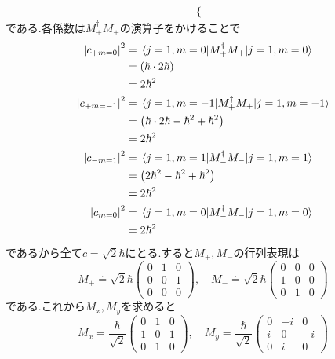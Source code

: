 \documentclass[uplatex,dvipdfmx, a4paper,11pt]{jsarticle}
\begin{document}
\begin{enumerate}[1.]
\begin{enumerate}[1）]
\begin{align*}
\begin{cases}
        \end{cases}
    \end{align*}
    である.各係数は$M_{\pm}^{\dagger}M_{\pm}$の演算子をかけることで
    \begin{align*}
        \abs{c_{+m=0}}^2&=\ev{M_{+}^{\dagger}M_{+}}{j=1,m=0}\\
        &=\qty(\hbar \cdot2\hbar)\\
        &=2\hbar^2\\
        \abs{c_{+m=-1}}^2&=\ev{M_{+}^{\dagger}M_{+}}{j=1,m=-1}\\
        &=\qty(\hbar\cdot2\hbar-\hbar^2+\hbar^2)\\
        &=2\hbar^2\\
        \abs{c_{-m=1}}^2&=\ev{M_{-}^{\dagger}M_{-}}{j=1,m=1}\\
        &=\qty(2\hbar^2-\hbar^2+\hbar^2)\\
        &=2\hbar^2\\
        \abs{c_{m=0}}^2&=\ev{M_{-}^{\dagger}M_{-}}{j=1,m=0}\\
        &=2\hbar^2
    \end{align*}
    であるから全て$c=\sqrt{2}\hbar$にとる.すると$M_{+},M_{-}$の行列表現は
    \begin{equation}
        M_{+}\doteq \sqrt{2}\hbar\begin{pmatrix}
            0&1&0\\
            0&0&1\\
            0&0&0
        \end{pmatrix},\quad 
        M_{-}\doteq \sqrt{2}\hbar\begin{pmatrix}
            0&0&0\\
            1&0&0\\
            0&1&0
        \end{pmatrix}
    \end{equation}
    である.これから$M_x, M_y$を求めると
    \begin{equation}
        M_x=\frac{\hbar}{\sqrt{2}}\begin{pmatrix}
            0&1&0\\
            1&0&1\\
            0&1&0
        \end{pmatrix},\quad 
        M_y=\frac{\hbar}{\sqrt{2}}\begin{pmatrix}
            0&-i&0\\
            i&0&-i\\
            0&i&0
        \end{pmatrix}

\end{equation}
\end{enumerate}
\end{enumerate}
\end{document}
